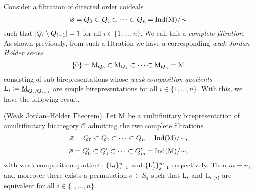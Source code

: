 \noindent Consider a filtration of directed order coideals
\begin{align*}
\begin{split}
\varnothing = Q_0 \subset Q_1 \subset \cdots \subset Q_n = \textnormal{Ind}(\textnormal{M})/\!\sim
\end{split}
\end{align*}
\noindent such that $\lvert Q_i \setminus Q_{i-1}\rvert = 1$ for all $i \in \{1, \dots, n\}$. We call this a {\em complete filtration}. As shown previously, from such a filtration we have a corresponding {\em weak Jordan-H\"{o}lder series}
\begin{align*}
\begin{split}
\{0\} = \textnormal{M}_{Q_0} \subset \textnormal{M}_{Q_1} \subset \cdots \subset \textnormal{M}_{Q_n} = \textnormal{M}
\end{split}
\end{align*}
\noindent consisting of sub-birepresentations whose {\em weak composition quotients} $\textnormal{L}_i \coloneqq \underline{\textnormal{M}}_{Q_i/Q_{i-1}}$ are simple birepresentations for all $i \in \{1, \dots, n\}$. With this, we have the following result.\\

\noindent\begin{theorem}\textnormal{(Weak Jordan--H\"{o}lder Theorem).} Let $\textnormal{M}$ be a multifinitary birepresentation of a\linebreak multifinitary bicategory $\mathscr{C}$ admitting the two complete filtrations
\begin{align*}
\begin{split}
\varnothing = Q_0 \subset Q_1 \subset \cdots \subset Q_n = \textnormal{Ind}(\textnormal{M})/\!\sim,%
\end{split}
\end{align*}
\begin{align*}
\begin{split}
\varnothing = Q_0' \subset Q_1' \subset \cdots \subset Q_m' = \textnormal{Ind}(\textnormal{M})/\!\sim,
\end{split}
\end{align*}
\noindent with weak composition quotients $\{\textnormal{L}_i\}_{i=1}^n$ and $\{\textnormal{L}_j'\}_{j=1}^m$ respectively. Then $m = n$, and moreover there exists a permutation $\sigma \in S_n$ such that $\textnormal{L}_i$ and $\textnormal{L}_{\sigma(i)}$ are equivalent for all $i \in \{1, \dots, n\}$.\\
\end{theorem}

